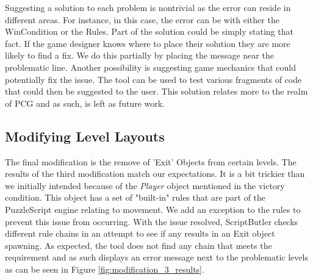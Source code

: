 Suggesting a solution to each problem is nontrivial as the error can reside in different areas. For instance, in this case, the error can be with either the WinCondition or the Rules. Part of the solution could be simply stating that fact. If the game designer knows where to place their solution they are more likely to find a fix. We do this partially by placing the message near the problematic line. Another possibility is suggesting game mechanics that could potentially fix the issue. The tool can be used to test various fragments of code that could then be suggested to the user. This solution relates more to the realm of PCG and as such, is left as future work. 

\subsection{Modifying Level Layouts}
The final modification is the remove of 'Exit' Objects from certain levels. The results of the third modification match our expectations. It is a bit trickier than we initially intended because of the \emph{Player} object mentioned in the victory condition. This object has a set of "built-in" rules that are part of the PuzzleScript engine relating to movement. We add an exception to the rules to prevent this issue from occurring. With the issue resolved, ScriptButler checks different rule chains in an attempt to see if any results in an Exit object spawning. As expected, the tool does not find any chain that meets the requirement and as such displays an error message next to the problematic levels as can be seen in Figure \ref{fig:modification_3_results}.

